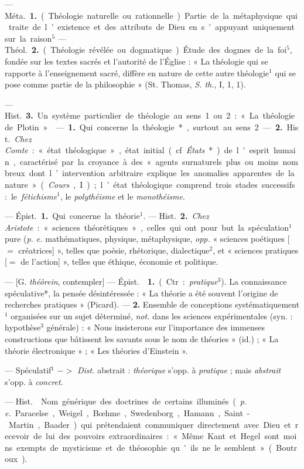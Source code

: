 \begin{itemize}[leftmargin=1cm, label=, itemsep=1pt]
 — \si{Méta.} {\bf 1.} (Théologie naturelle ou rationnelle).
Partie de la métaphysique qui traite de l’existence et des attributs de Dieu
en s'appuyant uniquement sur la raison$^5$ — \si{Théol.} {\bf 2.} (Théologie
révélée ou dogmatique). Étude des dogmes de la foi$^5$, fondée sur les textes
sacrés et l'autorité de l’Église : « La théologie qui se rapporte à
l’enseignement sacré, diffère en nature de cette autre théologie$^1$ qui se
pose comme partie de la philosophie » (St. Thomas, {\it S. th.}, I, 1, 1).

— \si{Hist.} {\bf 3.} Un système particulier de théologie au sens 1 ou 2 : «
La théologie de Plotin. »

 — {\bf 1.} Qui concerne la théologie*, surtout au sens 2.
—  {\bf 2.} \si{Hist.} {\it Chez Comte} : « état théologique », état
initial (cf. {\it États}*) de
l'esprit humain, caractérisé par la croyance à des « agents surnaturels plus
ou moins nombreux dont l’intervention arbitraire explique les anomalies
apparentes de la nature » ({\it Cours}, I) ; l’état théologique comprend
trois stades successifs : le {\it fétichisme}$^1$, le {\it polythéisme} et le
{\it monothéisme}.

 — \si{Épist.} {\bf 1.} Qui concerne la théorie$^1$. —
\si{Hist.} {\bf 2.} {\it Chez Aristote} : « sciences théorétiques », celles
qui ont pour but la spéculation$^1$ pure ({\it p. e.} mathématiques,
physique, métaphysique, {\it opp.} « sciences poétiques [$=$ créatrices] »,
telles que poésie, rhétorique, dialectique$^2$, et « sciences pratiques [$=$ de
l'action] », telles que éthique, économie et politique.

 — [G. {\it théôrein}, contempler] — \si{Épist.} 
{\bf 1.} (Ctr. : {\it pratique}$^3$). La connaissance spéculative*, la pensée
désintéressée : « La théorie a été souvent l’origine de recherches pratiques
» (Picard). —  {\bf 2.} Ensemble de conceptions
systématiquement$^1$ organisées sur un sujet déterminé, {\it not.} dans les
sciences expérimentales (syn. : hypothèse$^3$ générale) : « Nous insisterons
sur l'importance des immenses constructions que bâtissent les savants sous le
nom de théories » (id.) ; « La théorie électronique » ; « Les théories
d’Einstein ».

 — Spéculatif$^1$ $->$ {\it Dist.} abstrait : {\it théorique}
s’opp. à {\it pratique} ; mais {\it abstrait} s'opp. à {\it concret}.

 — \si{Hist.}  Nom générique des doctrines de
certains illuminés ({\it p. e.} Paracelse, Weigel, Bœhme, Swedenborg, Hamann,
Saint-Martin, Baader) qui prétendaient communiquer directement avec Dieu et
recevoir de lui des pouvoirs extraordinaires :
« Même Kant et Hegel sont moins exempts de mysticisme et de théosophie qu'ils
ne le semblent » (Boutroux).


\end{itemize}
